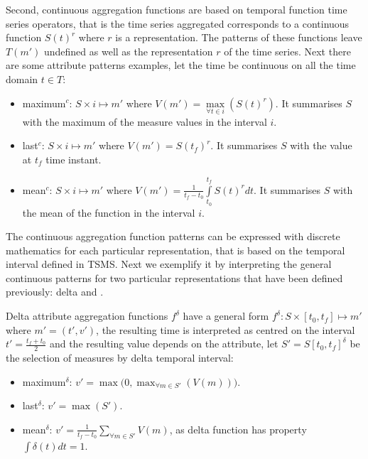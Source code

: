 Second, continuous aggregation functions are based on temporal
function time series operators, that is the time series aggregated
corresponds to a continuous function $S(t)^r$ where $r$ is a
representation. The patterns of these functions leave $T(m')$
undefined as well as the representation $r$ of the time series.  Next
there are some attribute patterns examples, let the time be continuous
on all the time domain $t\in T$:

\begin{itemize}
\item maximum$^c$: $S \times i \mapsto m'$ where $V(m') =
  \max\limits_{\forall t \in i}(S(t)^r)$. It summarises $S$ with the maximum
  of the measure values in the interval $i$.
\item last$^c$: $S \times i \mapsto m'$ where $V(m') = S(t_f)^r$. It
  summarises $S$ with the value at $t_f$ time instant.
\item mean$^c$: $S \times i \mapsto m'$ where $V(m') =
  \frac{1}{t_f-t_0} \int\limits_{t_0}^{t_f} S(t)^r dt$. It summarises $S$
  with the mean of the function in the interval $i$.
\end{itemize}


The continuous aggregation function patterns can be expressed with
discrete mathematics for each particular representation, that is based
on the temporal interval defined in TSMS. Next we exemplify it by
interpreting the general continuous patterns for two particular
representations that have been defined previously: delta and \zohe{}.


Delta attribute aggregation functions $f^\delta$ have a general form
$f^\delta : S \times [t_0,t_f]\mapsto m'$ where $m'=(t',v')$, the
resulting time is interpreted as centred on the interval
$t'=\frac{t_f+t_0}{2}$ and the resulting value depends on the
attribute, let $S'=S[t_0,t_f]^\delta$ be the selection of measures by
delta temporal interval:
\begin{itemize}
\item maximum$^\delta$: $v' = \max\big(0,\max_{\forall m \in S'}(V(m))\big)$. 
\item last$^\delta$: $v' = \max(S')$.
\item mean$^\delta$: $v' = \frac{1}{t_f-t_0} \sum\limits_{\forall m
    \in S'} V(m)$, as delta function has property $\int\delta(t)dt=1$.
\end{itemize}



